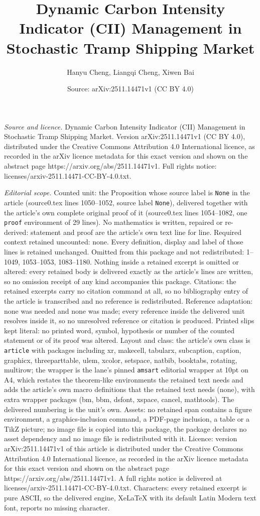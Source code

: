 \documentclass[10pt,a4paper]{amsart}
\title[Dynamic Carbon Intensity Indicator (CII) Management in Stoch]{Dynamic Carbon Intensity Indicator (CII) Management in Stochastic Tramp Shipping Market}
\author{Hanyu Cheng, Liangqi Cheng, Xiwen Bai}
\date{Source: arXiv:2511.14471v1 (CC BY 4.0)}
\begin{document}
\maketitle

\noindent\emph{Source and licence.} Dynamic Carbon Intensity Indicator (CII) Management in Stochastic Tramp Shipping Market. Version arXiv:2511.14471v1 (CC BY 4.0), distributed under the Creative Commons Attribution 4.0 International licence, as recorded in the arXiv licence metadata for this exact version and shown on the abstract page https://arxiv.org/abs/2511.14471v1. Full rights notice: licenses/arxiv-2511.14471-CC-BY-4.0.txt.\par\smallskip

\noindent\textit{Editorial scope.} Counted unit: the Proposition whose source label is \texttt{None} in the article (source0.tex lines 1050--1052, source label \texttt{None}), delivered together with the article's own complete original proof of it (source0.tex lines 1054--1082, one \texttt{proof} environment of 29 lines). No mathematics is written, repaired or re-derived: statement and proof are the article's own text line for line. Required context retained uncounted: none. Every definition, display and label of those lines is retained unchanged. Omitted from this package and not redistributed: 1--1049, 1053--1053, 1083--1180. Nothing inside a retained excerpt is omitted or altered: every retained body is delivered exactly as the article's lines are written, so no omission receipt of any kind accompanies this package. Citations: the retained excerpts carry no citation command at all, so no bibliography entry of the article is transcribed and no reference is redistributed. Reference adaptation: none was needed and none was made; every reference inside the delivered unit resolves inside it, so no unresolved reference or citation is produced. Printed slips kept literal: no printed word, symbol, hypothesis or number of the counted statement or of its proof was altered. Layout and class: the article's own class is \texttt{article} with packages including xr, makecell, tabularx, subcaption, caption, graphicx, threeparttable, ulem, xcolor, setspace, natbib, booktabs, rotating, multirow; the wrapper is the lane's pinned \texttt{amsart} editorial wrapper at 10pt on A4, which restates the theorem-like environments the retained text needs and adds the article's own macro definitions that the retained text needs (none), with extra wrapper packages (bm, bbm, dsfont, xspace, cancel, mathtools). The delivered numbering is the unit's own. Assets: no retained span contains a figure environment, a graphics-inclusion command, a PDF-page inclusion, a table or a TikZ picture; no image file is copied into this package, the package declares no asset dependency and no image file is redistributed with it. Licence: version arXiv:2511.14471v1 of this article is distributed under the Creative Commons Attribution 4.0 International licence, as recorded in the arXiv licence metadata for this exact version and shown on the abstract page https://arxiv.org/abs/2511.14471v1. A full rights notice is delivered at licenses/arxiv-2511.14471-CC-BY-4.0.txt. Characters: every retained excerpt is pure ASCII, so the delivered engine, XeLaTeX with its default Latin Modern text font, reports no missing character.
\end{document}
